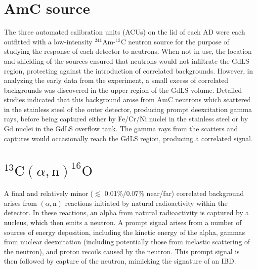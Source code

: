 \documentclass[../thesis.tex]{subfiles}
\begin{document}
\section{AmC source}

The three automated calibration units (ACUs) on the lid of each AD were each
outfitted with a low-intensity $^{241}$Am-$^{13}$C neutron source for the
purpose of studying the response of each detector to neutrons. When not in use,
the location and shielding of the sources ensured that neutrons would not
infiltrate the GdLS region, protecting against the introduction of correlated
backgrounds. However, in analyzing the early data from the experiment, a small
excess of correlated backgrounds was discovered in the upper region of the GdLS
volume. Detailed studies indicated that this background arose from AmC neutrons
which scattered in the stainless steel of the outer detector, producing prompt
deexcitation gamma rays, before being captured either by Fe/Cr/Ni nuclei in the
stainless steel or by Gd nuclei in the GdLS overflow tank. The gamma rays from
the scatters and captures would occasionally reach the GdLS region, producing a
correlated signal.

\newcommand\alphN{(\alpha,\mathrm{n})} \newcommand\CanO{^{13}\mathrm{C}(\alpha,
  \mathrm{n})^{16}\mathrm{O}}

\section{$\CanO$}

A final and relatively minor ($\lesssim$ 0.01\%/0.07\% near/far) correlated
background arises from $\alphN$ reactions initiated by natural radioactivity
within the detector. In these reactions, an alpha from natural radioactivity is
captured by a nucleus, which then emits a neutron. A prompt signal arises from a
number of sources of energy deposition, including the kinetic energy of the
alpha, gammas from nuclear deexcitation (including potentially those from
inelastic scattering of the neutron), and proton recoils caused by the
neutron. This prompt signal is then followed by capture of the neutron,
mimicking the signature of an IBD.
\end{document}
